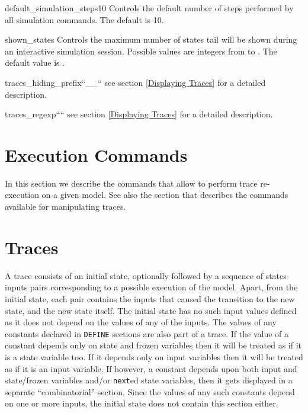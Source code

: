 



\begin{nusmvVar} {default\_simulation\_steps}{}{10}
Controls the default number of steps performed by all simulation
commands. The default is 10.
\end{nusmvVar}

\begin{nusmvVar} {shown\_states}{}{}
Controls the  maximum number  of states tail  will be shown  during an
interactive simulation session. Possible values are integers from
 to . The default value is .
\end{nusmvVar}

\begin{nusmvVar} {traces\_hiding\_prefix}{}{``\_\_``}
see section \ref{Displaying Traces} for a detailed description.
\end{nusmvVar}

\begin{nusmvVar} {traces\_regexp}{}{````}
see section \ref{Displaying Traces} for a detailed description.
\end{nusmvVar}

\section{Execution Commands}
\label{Execution Commands}

In this section we describe the commands that allow to perform
trace re-execution on a given model. See also the section  that
describes the commands available for manipulating traces.




\section{Traces}
\label{Traces}
%
A trace consists of an initial state, optionally followed by a
sequence of states-inputs pairs corresponding to a possible execution
of the model. Apart, from the initial state, each pair contains the
inputs that caused the transition to the new state, and the new state
itself. The initial state has no such input values defined as it does
not depend on the values of any of the inputs. The values of any
constants declared in \texttt{DEFINE} sections are also part of a
trace. If the value of a constant depends only on state and frozen
variables then it will be treated as if it is a state variable too. If
it depends only on input variables then it will be treated as if it is
an input variable. If however, a constant depends upon both input and
state/frozen variables and/or \texttt{next}ed state variables, then it
gets displayed in a separate ``combinatorial'' section. Since the
values of any such constants depend on one or more inputs, the initial
state does not contain this section either.\\

